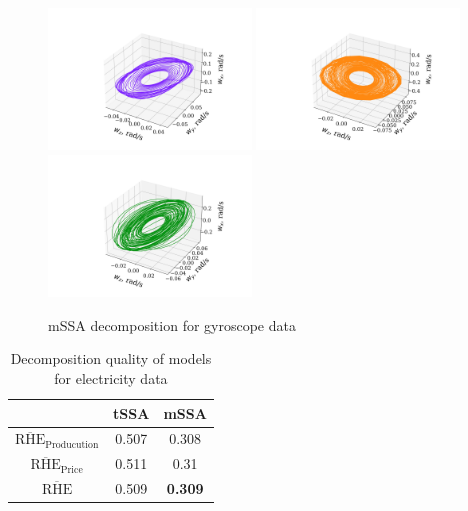 \documentclass[referee, pdflatex, sn-mathphys-num]{sn-jnl}
\theoremstyle{definition}
\theoremstyle{plain}
\begin{document}
	\begin{figure}[h]
		\centering
		\includegraphics[width=0.48\textwidth, keepaspectratio]{gyro_1_mssa.png}
		\includegraphics[width=0.48\textwidth, keepaspectratio]{gyro_2_mssa.png}
		\includegraphics[width=0.48\textwidth, keepaspectratio]{gyro_3_mssa.png}
		\caption{mSSA decomposition for gyroscope data}\label{fig:gyro_decomp_mssa}
	\end{figure}
	
	\def\arraystretch{1.2}
	\begin{table}[h!]
		\centering
		\caption{Decomposition quality of models for electricity data}\label{tab:decomp_electr_results}
		\begin{tabular}{|c|c|c|}
			\hline
			& tSSA  & mSSA           \\ \hline
			$ \overline{\text{RHE}}_{\text{Producution}} $  & 0.507 & 0.308          \\ \hline
			$ \overline{\text{RHE}}_{\text{Price}} $      & 0.511 & 0.31           \\ \hline
			$ \overline{\text{RHE}} $             & 0.509 & \textbf{0.309} \\ \hline
		\end{tabular}
	\end{table}
	
\end{document}
